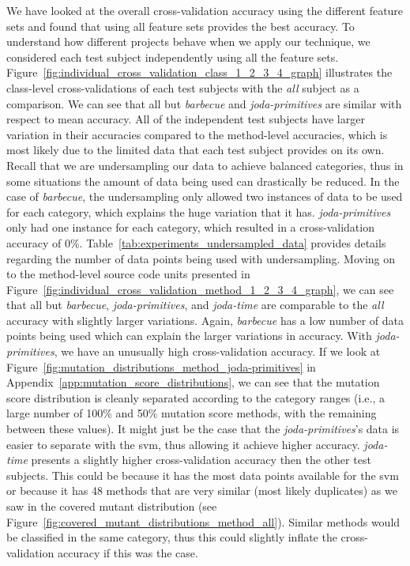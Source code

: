 We have looked at the overall cross-validation accuracy using the different feature sets and found that using all feature sets provides the best accuracy. To understand how different projects behave when we apply our technique, we considered each test subject independently using all the feature sets. Figure~\ref{fig:individual_cross_validation_class_1_2_3_4_graph} illustrates the class-level cross-validations of each test subjects with the \emph{all} subject as a comparison. We can see that all but \emph{barbecue} and \emph{joda-primitives} are similar with respect to mean accuracy. All of the independent test subjects have larger variation in their accuracies compared to the method-level accuracies, which is most likely due to the limited data that each test subject provides on its own. Recall that we are undersampling our data to achieve balanced categories, thus in some situations the amount of data being used can drastically be reduced. In the case of \emph{barbecue}, the undersampling only allowed two instances of data to be used for each category, which explains the huge variation that it has. \emph{joda-primitives} only had one instance for each category, which resulted in a cross-validation accuracy of 0\%. Table~\ref{tab:experiments_undersampled_data} provides details regarding the number of data points being used with undersampling. Moving on to the method-level source code units presented in Figure~\ref{fig:individual_cross_validation_method_1_2_3_4_graph}, we can see that all but \emph{barbecue}, \emph{joda-primitives}, and \emph{joda-time} are comparable to the \emph{all} accuracy with slightly larger variations. Again, \emph{barbecue} has a low number of data points being used which can explain the larger variations in accuracy. With \emph{joda-primitives}, we have an unusually high cross-validation accuracy. If we look at Figure~\ref{fig:mutation_distributions_method_joda-primitives} in Appendix~\ref{app:mutation_score_distributions}, we can see that the mutation score distribution is cleanly separated according to the category ranges (i.e., a large number of 100\% and 50\% mutation score methods, with the remaining between these values). It might just be the case that the \emph{joda-primitives}'s data is easier to separate with the \gls{svm}, thus allowing it achieve higher accuracy. \emph{joda-time} presents a slightly higher cross-validation accuracy then the other test subjects. This could be because it has the most data points available for the \gls{svm} or because it has 48 methods that are very similar (most likely duplicates) as we saw in the covered mutant distribution (see Figure~\ref{fig:covered_mutant_distributions_method_all}). Similar methods would be classified in the same category, thus this could slightly inflate the cross-validation accuracy if this was the case.


